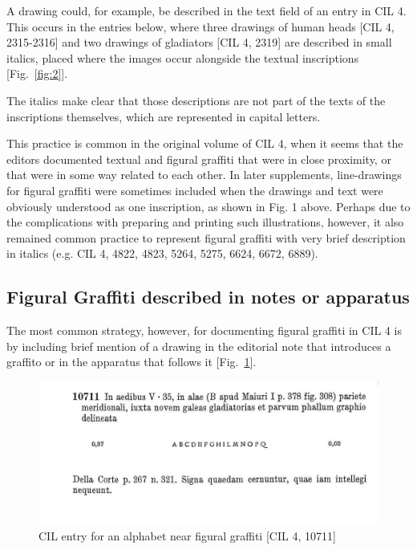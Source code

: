 \documentclass[amsthm,ebook]{saparticle}
\begin{document}
A drawing could, for example, be described in the text field of an entry in CIL 4. This occurs in the entries below,
where three drawings of human heads [CIL 4, 2315-2316] and two drawings of gladiators [CIL 4, 2319] are described in
small italics, placed where the images occur alongside the textual inscriptions [Fig.~\ref{fig:2}]. 



The italics make clear that those descriptions are not part of the texts of the inscriptions themselves, which are
represented in capital letters.




This practice is common in the original volume of CIL 4, when it seems that the editors documented textual and
figural graffiti that were in close proximity, or that were in some way related to each other. In later supplements,
line-drawings for figural graffiti were sometimes included when the drawings and text were obviously understood as one
inscription, as shown in Fig. 1 above. Perhaps due to the complications with preparing and printing such
illustrations, however, it also remained common practice to represent figural graffiti with very brief description in
italics (e.g. CIL 4, 4822, 4823, 5264, 5275, 6624, 6672, 6889). 




\subsection{Figural Graffiti described in notes or apparatus}


\noindent The most common strategy, however, for documenting figural graffiti in CIL 4 is by including brief mention of a drawing
in the editorial note that introduces a graffito or in the apparatus that follows it [Fig.~\ref{fig:3}].  



\begin{figure}[!bp]
\centering
 \includegraphics[width=\columnwidth]{EAGLE2016BenefielSypniewski-img003.jpg}
\caption{CIL entry for an alphabet near figural graffiti [CIL 4, 10711]}
\label{fig:3}
\end{figure}
 
\end{document}

